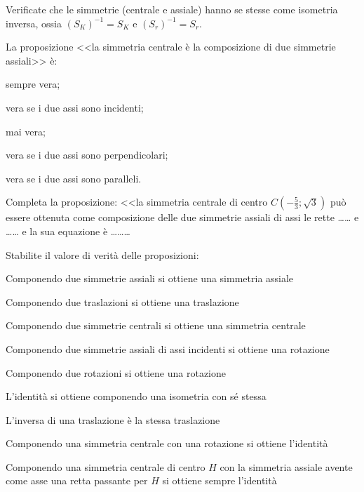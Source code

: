 \begin{esercizio}
\label{ese:8.83} %
Verificate che le simmetrie (centrale e assiale) hanno se stesse come isometria inversa, ossia $(S_K)^{-1}=S_K$ e $(S_r)^{-1}=S_r$.
\end{esercizio}

\begin{esercizio}
\label{ese:8.84} %
La proposizione <<la simmetria centrale è la composizione di due simmetrie assiali>> è:
\begin{enumeratea}
\item sempre vera;
\item vera se i due assi sono incidenti;
\item mai vera;
\item vera se i due assi sono perpendicolari;
\item vera se i due assi sono paralleli.
\end{enumeratea}
\end{esercizio}

\begin{esercizio}
\label{ese:8.85} %
Completa la proposizione: <<la simmetria centrale di centro $C\left(-\frac{5}{3};\sqrt{3}\right)$ può essere ottenuta come composizione delle due simmetrie assiali di assi le rette \ldots\ldots{} e \ldots\ldots{} e la sua equazione è \ldots\ldots\ldots{}
\end{esercizio}

\begin{esercizio}
\label{ese:8.86} %
Stabilite il valore di verità delle proposizioni:
\begin{enumeratea}
\item Componendo due simmetrie assiali si ottiene una simmetria assiale\hfill\boxV\quad\boxF
\item Componendo due traslazioni si ottiene una traslazione\hfill\boxV\quad\boxF
\item Componendo due simmetrie centrali si ottiene una simmetria centrale\hfill\boxV\quad\boxF
\item Componendo due simmetrie assiali di assi incidenti si ottiene una rotazione\hfill\boxV\quad\boxF
\item Componendo due rotazioni si ottiene una rotazione\hfill\boxV\quad\boxF
\item L'identità si ottiene componendo una isometria con sé stessa\hfill\boxV\quad\boxF
\item L'inversa di una traslazione è la stessa traslazione\hfill\boxV\quad\boxF
\item Componendo una simmetria centrale con una rotazione si ottiene l'identità\hfill\boxV\quad\boxF
\item Componendo una simmetria centrale di centro $H$ con la simmetria assiale avente come asse una retta passante per $H$ si ottiene sempre l'identità\hfill\boxV\quad\boxF
\end{enumeratea}
\end{esercizio}


